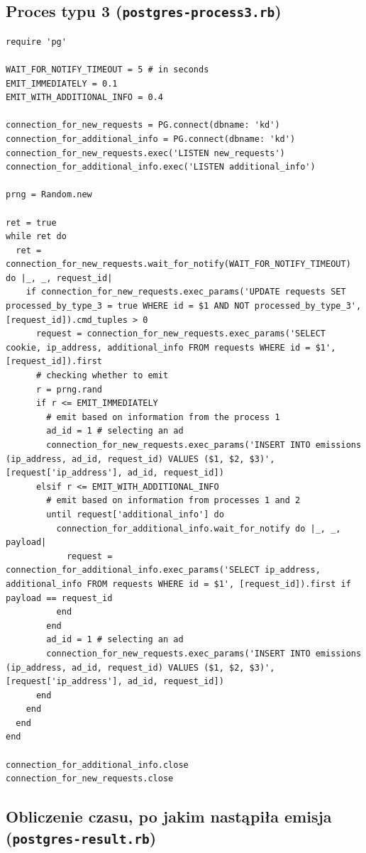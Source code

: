 \documentclass[a4paper,11pt]{article}
\begin{document}
\subsection{Proces typu 3 (\texttt{postgres-process3.rb})}

\begin{lstlisting}
require 'pg'

WAIT_FOR_NOTIFY_TIMEOUT = 5 # in seconds
EMIT_IMMEDIATELY = 0.1
EMIT_WITH_ADDITIONAL_INFO = 0.4

connection_for_new_requests = PG.connect(dbname: 'kd')
connection_for_additional_info = PG.connect(dbname: 'kd')
connection_for_new_requests.exec('LISTEN new_requests')
connection_for_additional_info.exec('LISTEN additional_info')

prng = Random.new

ret = true
while ret do
  ret = connection_for_new_requests.wait_for_notify(WAIT_FOR_NOTIFY_TIMEOUT) do |_, _, request_id|
    if connection_for_new_requests.exec_params('UPDATE requests SET processed_by_type_3 = true WHERE id = $1 AND NOT processed_by_type_3', [request_id]).cmd_tuples > 0
      request = connection_for_new_requests.exec_params('SELECT cookie, ip_address, additional_info FROM requests WHERE id = $1', [request_id]).first
      # checking whether to emit
      r = prng.rand
      if r <= EMIT_IMMEDIATELY
        # emit based on information from the process 1
        ad_id = 1 # selecting an ad
        connection_for_new_requests.exec_params('INSERT INTO emissions (ip_address, ad_id, request_id) VALUES ($1, $2, $3)', [request['ip_address'], ad_id, request_id])
      elsif r <= EMIT_WITH_ADDITIONAL_INFO
        # emit based on information from processes 1 and 2
        until request['additional_info'] do
          connection_for_additional_info.wait_for_notify do |_, _, payload|
            request = connection_for_additional_info.exec_params('SELECT ip_address, additional_info FROM requests WHERE id = $1', [request_id]).first if payload == request_id
          end
        end
        ad_id = 1 # selecting an ad
        connection_for_new_requests.exec_params('INSERT INTO emissions (ip_address, ad_id, request_id) VALUES ($1, $2, $3)', [request['ip_address'], ad_id, request_id])
      end
    end
  end
end

connection_for_additional_info.close
connection_for_new_requests.close
\end{lstlisting}


\subsection{Obliczenie czasu, po jakim nastąpiła emisja (\texttt{postgres-result.rb})}
\end{document}
